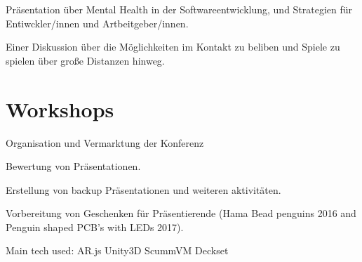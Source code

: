 \documentclass[a4paper]{deedy-resume_twopage} %
\begin{document}
\begin{minipage}[t]{0.66\textwidth}


  Präsentation über	Mental Health in der Softwareentwicklung, und Strategien für Entiwckler/innen und Artbeitgeber/innen.

  \sectionspace %



  Einer Diskussion über die Möglichkeiten im Kontakt zu beliben und Spiele zu spielen über große Distanzen hinweg.

  \sectionspace %

  \section{Workshops}


  \vspace{\topsep} %
  \begin{tightitemize}
  \item Organisation und Vermarktung der Konferenz
  \item Bewertung von Präsentationen.
  \item Erstellung von backup Präsentationen und weiteren aktivitäten.
  \item Vorbereitung von Geschenken für Präsentierende (Hama Bead penguins 2016 and Penguin shaped PCB's with LEDs 2017).
  \end{tightitemize}
  Main tech used: \textbullet{} AR.js \textbullet{} Unity3D \textbullet{} ScummVM \textbullet{} Deckset


\end{minipage}
\end{document}
